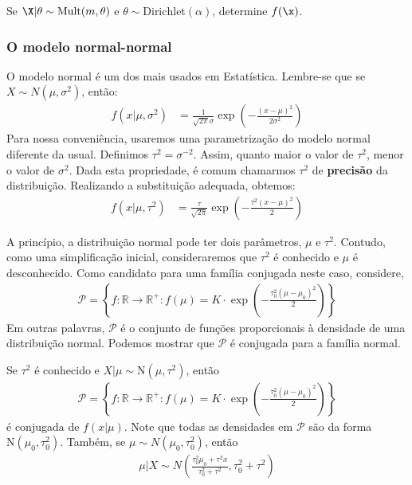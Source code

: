 \begin{exercise}
 Se $\X|\theta \sim \text{Mult}(m,\theta)$ e
 $\theta \sim \text{Dirichlet}(\alpha)$,
 determine $f(\x)$.
\end{exercise}

\subsubsection{O modelo normal-normal}
\label{sec:conj-norm}

O modelo normal é um dos mais usados em Estatística.
Lembre-se que se $X \sim N(\mu,\sigma^{2})$, então:
\begin{align*}
 f(x|\mu,\sigma^{2})
 &= \frac{1}{\sqrt{2\pi}\sigma}
 \exp\left(-\frac{(x-\mu)^{2}}{2\sigma^{2}}\right)
\end{align*}
Para nossa conveniência, usaremos uma 
parametrização do modelo normal diferente da usual.
Definimos $\tau^{2} = \sigma^{-2}$.
Assim, quanto maior o valor de $\tau^{2}$,
menor o valor de $\sigma^{2}$.
Dada esta propriedade, é comum chamarmos
$\tau^{2}$ de \textbf{precisão} da distribuição.
Realizando a substituição adequada, obtemos:
\begin{align*}
 f(x|\mu,\tau^{2})
 &= \frac{\tau}{\sqrt{2\pi}}
 \exp\left(-\frac{\tau^{2}(x-\mu)^{2}}{2}\right)
\end{align*}

A princípio, a distribuição normal pode ter
dois parâmetros, $\mu$ e $\tau^{2}$.
Contudo, como uma simplificação inicial,
consideraremos que $\tau^{2}$ é conhecido e
$\mu$ é desconhecido.
Como candidato para uma família conjugada neste caso, considere,
\begin{align*}
 \mathcal{P} 
 =\left\{f: \mathbb{R} \rightarrow \mathbb{R}^{+}:
 f(\mu) = K \cdot \exp\left(-\frac{\tau_{0}^{2}(\mu-\mu_{0})^{2}}{2}\right) \right\}
\end{align*}
Em outras palavras, $\mathcal{P}$ é o
conjunto de funções proporcionais à densidade de
uma distribuição normal.
Podemos mostrar que $\mathcal{P}$ é
conjugada para a família normal.

\begin{lemma}
 \label{lemma:conjugate_normal_mean}
 Se $\tau^{2}$ é conhecido e
 $X|\mu \sim \text{N}(\mu,\tau^{2})$,
 então
 \begin{align*}
  \mathcal{P} 
  =\left\{f: \mathbb{R} \rightarrow \mathbb{R}^{+}:
  f(\mu) = K \cdot \exp\left(-\frac{\tau_{0}^{2}(\mu-\mu_{0})^{2}}{2}\right) \right\}
 \end{align*}
 é conjugada de $f(x|\mu)$.
 Note que todas as densidades em $\mathcal{P}$ são
 da forma $\text{N}(\mu_{0},\tau_{0}^{2})$.
 Também, se $\mu \sim N(\mu_{0},\tau_{0}^{2})$, então
 \begin{align*}
  \mu|X \sim N\left(\frac{\tau_{0}^{2}\mu_{0}+\tau^{2}x}
  {\tau_{0}^{2}+\tau^{2}},\tau_{0}^{2}+\tau^{2}\right)
 \end{align*}
\end{lemma}

